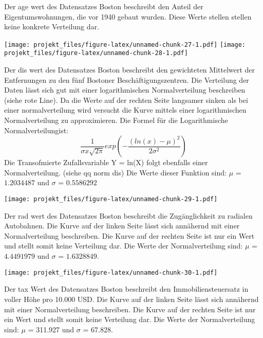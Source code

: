 \documentclass[]{article}
\begin{document}
Der age wert des Datensatzes Boston beschreibt den Anteil der
Eigentumswohnungen, die vor 1940 gebaut wurden. Diese Werte stellen
stellen keine konkrete Verteilung dar.

\texttt{[image: projekt\_files/figure-latex/unnamed-chunk-27-1.pdf]}
\texttt{[image: projekt\_files/figure-latex/unnamed-chunk-28-1.pdf]}

Der dis wert des Datensatzes Boston beschreibt den gewichteten
Mittelwert der Entfernungen zu den fünf Bostoner Beschäftigungszentren.
Die Verteilung der Daten lässt sich gut mit einer logarithmischen
Normalverteilung beschreiben (siehe rote Line). Da die Werte auf der
rechten Seite langsamer sinken als bei einer normalverteilung wird
versucht die Kurve mittels einer logarithmischen Normalverteilung zu
approximieren. Die Formel für die Logarithmische Normalverteilungist:
\[ \frac{1}{\sigma x \sqrt{2\pi}}exp(-\frac{(ln(x)-\mu)^2}{2\sigma^2})  \]
Die Transofmierte Zufallsvariable Y = ln(X) folgt ebenfalls einer
Normalverteilung. (siehe qq norm dis) Die Werte dieser Funktion sind:
\(\mu\) = \(1.2034487\) und \(\sigma\) = \(0.5586292\)

\texttt{[image: projekt\_files/figure-latex/unnamed-chunk-29-1.pdf]}

Der rad wert des Datensatzes Boston beschreibt die Zugänglichkeit zu
radialen Autobahnen. Die Kurve auf der linken Seite lässt sich annähernd
mit einer Normalverteilung beschreiben. Die Kurve auf der rechten Seite
ist nur ein Wert und stellt somit keine Verteilung dar. Die Werte der
Normalverteilung sind: \(\mu\) = \(4.4491979\) und \(\sigma\) =
\(1.6328849\).

\texttt{[image: projekt\_files/figure-latex/unnamed-chunk-30-1.pdf]}

Der tax Wert des Datensatzes Boston beschreibt den Immobiliensteuersatz
in voller Höhe pro 10.000 USD. Die Kurve auf der linken Seite lässt sich
annähernd mit einer Normalverteilung beschreiben. Die Kurve auf der
rechten Seite ist nur ein Wert und stellt somit keine Verteilung dar.
Die Werte der Normalverteilung sind: \(\mu\) = 311.927 und \(\sigma\) =
67.828.
\end{document}
